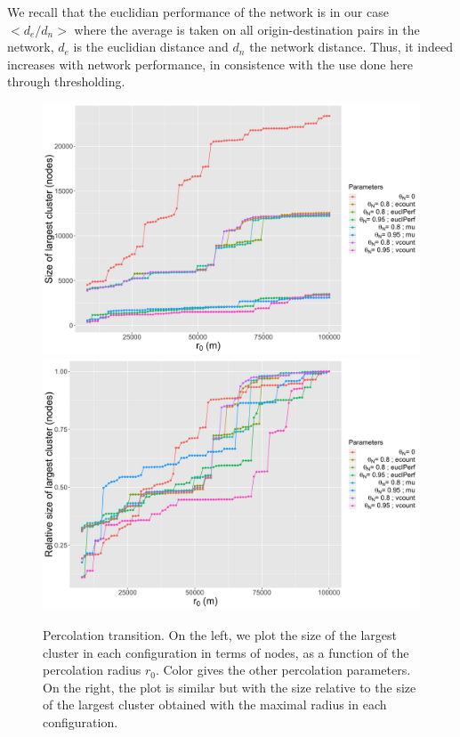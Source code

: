 \documentclass{jimis-en}
\begin{document}
We recall that the euclidian performance of the network \citep{banos2012towards} is in our case $<d_e/d_n>$ where the average is taken on all origin-destination pairs in the network, $d_e$ is the euclidian distance and $d_n$ the network distance. Thus, it indeed increases with network performance, in consistence with the use done here through thresholding.




\begin{figure}[ht] 
  {\includegraphics[width=0.49\linewidth]{figures/abssize_nodes.png}}
  {\includegraphics[width=0.49\linewidth]{figures/relsize_nodes.png}}
  \centering
  \caption{Percolation transition. On the left, we plot the size of the largest cluster in each configuration in terms of nodes, as a function of the percolation radius $r_0$. Color gives the other percolation parameters. On the right, the plot is similar but with the size relative to the size of the largest cluster obtained with the maximal radius in each configuration.\label{fig:percolation}}
\end{figure}
\end{document}
